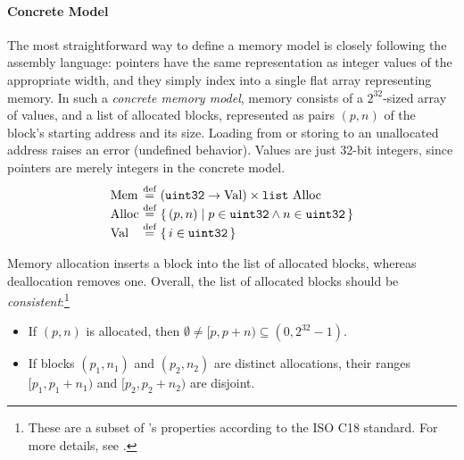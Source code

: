 



\paragraph{Concrete Model}

The most straightforward way to define a memory model is closely following the assembly language:
pointers have the same representation as integer values of the appropriate width, and they simply
index into a single flat array representing memory.  In such a \emph{concrete memory model}, memory
consists of a $2^{32}$-sized array of values, and a list of allocated blocks, represented as pairs
$(p,n)$ of the block's starting address and its size.  Loading from or storing to an unallocated
address raises an error (\ie undefined behavior).  Values are just 32-bit integers, since pointers
are merely integers in the concrete model.
\[
\begin{array}{@{}l@{~}c@{~}l@{}}
\mathrm{Mem} &\defeq& (\usize \to \rtlVal) \times \mathtt{list}\ \mathrm{Alloc} \\
\mathrm{Alloc} &\defeq& \setof{(p,n) \suchthat p \in \usize \land n \in \usize} \\
\rtlVal &\defeq& \setof{i\in\usize}
\end{array}
\]

Memory allocation inserts a block into the list of allocated blocks, whereas deallocation removes
one.  Overall, the list of allocated blocks should be \emph{consistent}:\footnote{These are a subset
  of 's properties according to the ISO C18 standard.  For more details, see
  \cite[\S7.22.3p1 and \S6.5.8p5]{c18}.}
\begin{itemize}
\item If $(p, n)$ is allocated, then $\emptyset \neq [p,p+n) \subseteq
  (0,2^{32}-1)$.
\item If blocks $(p_1, n_1)$ and $(p_2, n_2)$ are distinct
  allocations, their ranges $[p_1,p_1+n_1)$ and $[p_2,p_2+n_2)$
  are disjoint.
\end{itemize}

